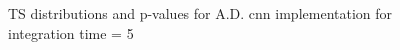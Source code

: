 \begin{figure}
    \centering
    
    
    \caption{TS distributions and p-values for A.D. cnn implementation for integration time = 5}
    \label{fig:ts-distribution-and-p-values-cnn-it-5}
\end{figure}

